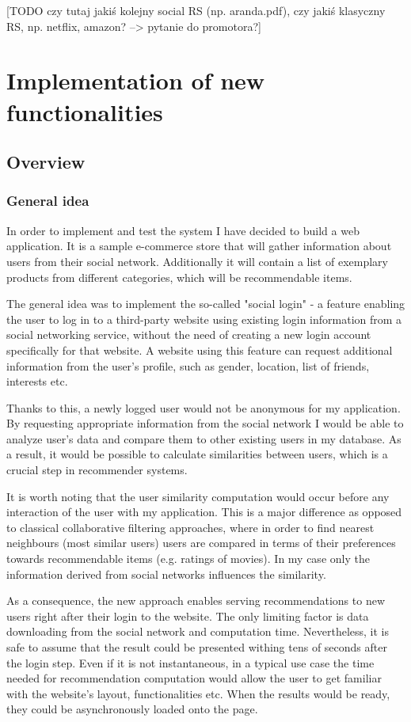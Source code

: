 \documentclass[12pt]{report}
\begin{document}
[TODO czy tutaj jakiś kolejny social RS (np. aranda.pdf), czy jakiś klasyczny RS, np. netflix, amazon? --> pytanie do promotora?]

\chapter{Implementation of new functionalities}

\section{Overview}
\subsection{General idea}
In order to implement and test the system I have decided to build a web application. It is a sample e-commerce store that will gather information about users from their social network. Additionally it will contain a list of exemplary products from different categories, which will be recommendable items. 

The general idea was to implement the so-called "social login" - \cite{social_login} a feature enabling the user to log in to a third-party website using existing login information from a social networking service, without the need of creating a new login account specifically for that website. A website using this feature can request additional information from the user's profile, such as gender, location, list of friends, interests etc. 

Thanks to this, a newly logged user would not be anonymous for my application. By requesting appropriate information from the social network I would be able to analyze user's data and compare them to other existing users in my database. As a result, it would be possible to calculate similarities between users, which is a crucial step in recommender systems.

It is worth noting that the user similarity computation would occur before any interaction of the user with my application. This is a major difference as opposed to classical collaborative filtering approaches, where in order to find nearest neighbours (most similar users) users are compared in terms of their preferences towards recommendable items (e.g. ratings of movies). In my case only the information derived from social networks influences the similarity.

As a consequence, the new approach enables serving recommendations to new users right after their login to the website. The only limiting factor is data downloading from the social network and computation time. Nevertheless, it is safe to assume that the result could be presented withing tens of seconds after the login step. Even if it is not instantaneous, in a typical use case the time needed for recommendation computation would allow the user to get familiar with the website's layout, functionalities etc. When the results would be ready, they could be asynchronously loaded onto the page. 
\end{document}

